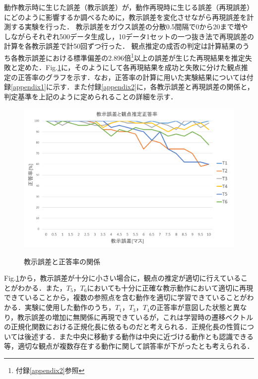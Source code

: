 動作教示時に生じた誤差（教示誤差）が，動作再現時に生じる誤差（再現誤差）にどのように影響するか調べるために，教示誤差を変化させながら再現誤差を計測する実験を行った．
教示誤差をガウス誤差の分散0.5間隔で0から20まで増やしながらそれぞれ500データ生成し，10データ1セットの一つ抜き法で再現誤差の計算を各教示誤差で計50回ずつ行った．
観点推定の成否の判定は計算結果のうち各教示誤差における標準偏差の2.896倍\footnote{付録\ref{appendix2}参照}以上の誤差が生じた再現結果を推定失敗と定めた．Fig.\ref{figure:success_rate}に，そのようにして各再現結果を成功と失敗に分けた観点推定の正答率のグラフを示す．なお，正答率の計算に用いた実験結果については付録\ref{appendix1}に示す．また付録\ref{appendix2}に，各教示誤差と再現誤差の関係と，判定基準を上記のように定められることの詳細を示す．
	\begin{figure}[h]
		\begin{center}
			\includegraphics[width=14cm]{chart2.png} \\ %
			\caption{教示誤差と正答率の関係}
			\label{figure:success_rate}
		\end{center}
	\end{figure}

Fig.\ref{figure:success_rate}から，教示誤差が十分に小さい場合に，観点の推定が適切に行えていることがわかる．また，$T_{5}$，$T_{6}$においても十分に正確な教示動作において適切に再現できていることから，複数の参照点を含む動作を適切に学習できていることがわかる．実験に使用した動作のうち，$T_{1}$，$T_{3}$，$T_{4}$の正答率が意図した状態と異なり，教示誤差の増加に無関係に再現できているが，これは学習時の遷移ベクトルの正規化関数における正規化長に依るものだと考えられる．正規化長の性質については後述する．また中央に移動する動作は中央に近づける動作とも認識できる等，適切な観点が複数存在する動作に関して誤答率が下がったとも考えられる．

